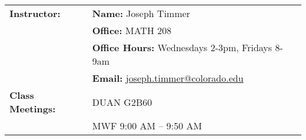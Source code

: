 \documentclass[11pt]{article}
\makeatletter
\newcommand{\TheInstructor}{Joseph Timmer}
\newcommand{\TheOffice}{MATH 208}
\newcommand{\TheOfficeHours}{Wednesdays 2-3pm, Fridays 8-9am}
\newcommand{\TheEmail}{joseph.timmer@colorado.edu}
\newcommand{\TheLocation}{DUAN G2B60}
\newcommand{\TheTime}{9:00 AM -- 9:50 AM}
\makeatother
\begin{document}
\begin{longtable}{lp{5.2in}}
%
\textbf{Instructor:}
  & {\bf Name:}   \hspace{8.00ex} \TheInstructor
  \\
  & {\bf Office:}  \hspace{8.25ex} \TheOffice
  \\
  & {\bf Office Hours:} \hspace{.20ex} \TheOfficeHours
  \\
  & {\bf Email:}  \hspace{8.00ex} \href{mailto:\TheEmail}{\TheEmail}
  \\[6pt]
%

\textbf{Class Meetings:}
  & \TheLocation
  \\
  & MWF \TheTime 
 \\[6pt]


\end{longtable}
\end{document}
